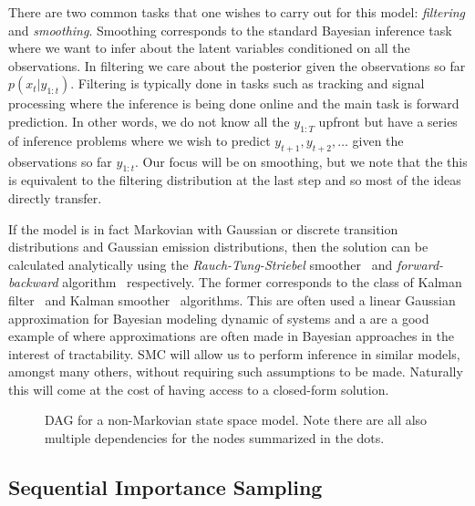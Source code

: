 There are two common tasks that one wishes to carry out for this model: \emph{filtering} and
\emph{smoothing}.  Smoothing corresponds to the standard Bayesian inference task where we
want to infer about the latent variables conditioned on all the observations.  In filtering
we care about the posterior given the observations
so far $p(x_t | y_{1:t})$.  Filtering is typically done in tasks such as tracking and signal
processing where the inference is being done online and the main task is forward prediction.
In other words, we do not know all the $y_{1:T}$ upfront but have a series of inference problems
where we wish to predict $y_{t+1},y_{t+2},\dots$ given the observations so far $y_{1:t}$.  Our
focus will be on smoothing, but we note that the this is equivalent to the filtering distribution
at the last step and so most of the ideas directly transfer.

If the model is in fact Markovian with Gaussian or discrete transition distributions and Gaussian
emission distributions, then the solution can be calculated analytically using the \emph{Rauch-Tung-Striebel}
smoother~\citep{rauch1965maximum} and \emph{forward-backward} algorithm~\citep{rabiner1986introduction} respectively.
The former corresponds to the class of Kalman filter~\citep{kalman1960new} and Kalman smoother~\citep{rauch1965maximum}
algorithms.  This are often used a linear Gaussian approximation for Bayesian modeling dynamic of systems and
a are a good example of where approximations are often made in Bayesian approaches in the interest of
tractability.  SMC will allow us to perform inference in similar models, amongst many others, without requiring
such assumptions to be made.  Naturally this will come at the cost of having access to a closed-form solution.

\begin{figure}[t]
	\centering 
	
	\caption{DAG for a non-Markovian state space model.  Note there are all also multiple dependencies
		for the nodes summarized in the dots.
		\label{fig:part:nmssm}}
\end{figure}

\subsection{Sequential Importance Sampling}
\label{sec:part:smc:sis}


